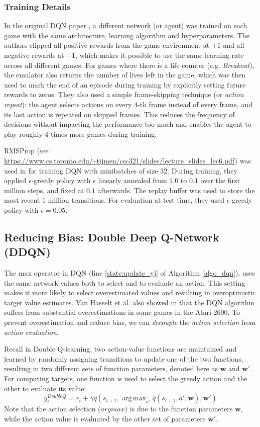 \documentclass{article}
\newcommand{\w}{\mathbf{w}}
\DeclareMathOperator*{\argmax}{arg\,max}
\begin{document}
\subsubsection{Training Details}
In the original DQN paper \cite{ref_DQN}, a different network (or agent) was trained on each game with the same architecture, learning algorithm and hyperparameters. The authors clipped all positive rewards from the game environment at $+1$ and all negative rewards at $-1$, which makes it possible to use the same learning rate across all different games. For games where there is a life counter (e.g. \textit{Breakout}), the emulator also returns the number of lives left in the game, which was then used to mark the end of an episode during training by explicitly setting future rewards to zeros. They also used a simple frame-skipping technique (or \textit{action repeat}): the agent selects actions on every $4$-th frame instead of every frame, and its last action is repeated on skipped frames. This reduces the frequency of decisions without impacting the performance too much and enables the agent to play roughly $4$ times more games during training.

RMSProp (see \url{https://www.cs.toronto.edu/~tijmen/csc321/slides/lecture_slides_lec6.pdf}) was used in \cite{ref_DQN} for training DQN with minibatches of size $32$. During training, they applied $\epsilon$-greedy policy with $\epsilon$ linearly annealed from $1.0$ to $0.1$ over the first million steps, and fixed at $0.1$ afterwards. The replay buffer was used to store the most recent $1$ million transitions. For evaluation at test time, they used $\epsilon$-greedy policy with $\epsilon = 0.05$.

\subsection{Reducing Bias: Double Deep Q-Network (DDQN) \cite{ref_DDQN}}
The max operator in DQN (line \ref{state:update_yj} of Algorithm \ref{algo_dqn}), uses the same network values both to select and to evaluate an action. This setting makes it more likely to select overestimated values and resulting in overoptimistic target value estimates. Van Hasselt et al. also showed in \cite{ref_DDQN} that the DQN algorithm suffers from substantial overestimations in some games in the Atari 2600. To prevent overestimation and reduce bias, we can \textit{decouple} the \textit{action selection} from \textit{action evaluation}.

Recall in Double Q-learning, two action-value functions are maintained and learned by randomly assigning transitions to update one of the two functions, resulting in two different sets of function parameters, denoted here as $\w$ and $\w'$. For computing targets, one function is used to select the greedy action and the other to evaluate its value:
\begin{equation} \label{target_dql}
y_t^{DoubleQ} = r_t + \gamma \hat{q}(s_{t+1}, \argmax_{a'} \hat{q}(s_{t+1}, a', \w), \w')
\end{equation}
Note that the action selection ($argmax$) is due to the function parameters $\w$, while the action value is evaluated by the other set of parameters $\w'$.
\end{document}
